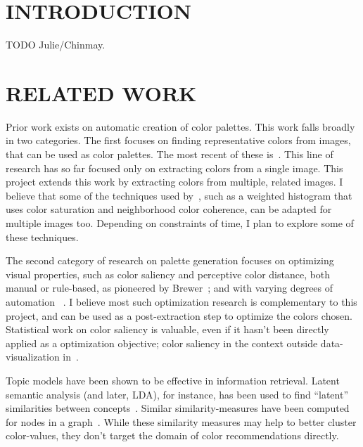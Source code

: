 \documentclass{article}
\begin{document}



\section{INTRODUCTION}
TODO Julie/Chinmay. 
\section{RELATED WORK}
Prior work exists on automatic creation of color palettes. This work falls broadly in two categories. The first focuses on finding representative  colors from images, that can be used as color palettes. The most recent of these is~\cite{morse2007image}. This line of research has so far focused only on extracting colors from a single image. This project extends this work by extracting colors from multiple, related images. I believe that some of the techniques used by~\cite{morse2007image}, such as a weighted histogram that uses color saturation and neighborhood color coherence, can be adapted for multiple images too. Depending on constraints of time, I plan to explore some of these techniques.
	
The second category of research on palette generation focuses on optimizing visual properties, such as color saliency and perceptive color distance, both manual or rule-based, as pioneered by Brewer~\cite{brewer1999color}; and  with varying degrees of automation ~\cite{healey1996choosing, zeileis2009RGBland}. I believe most such optimization research is complementary to this project, and can be used as a post-extraction step to optimize the colors chosen. Statistical work on color saliency is valuable, even if it hasn't been directly applied as a optimization objective; color saliency in the context outside data-visualization in~\cite{chuang2008probabilistic, benavente2002statistical}. 

Topic models have been shown to be effective in information retrieval. Latent semantic analysis (and later, LDA), for instance, has been used to find ``latent'' similarities between concepts~\cite{dumais1988using, blei2003latent}. Similar similarity-measures have been computed for nodes in a graph~\cite{jeh2002simrank}. While these similarity measures may help to better cluster color-values, they don't target the domain of color recommendations directly. 
\end{document}
